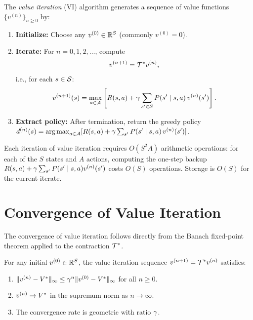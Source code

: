 \documentclass[11pt,a4paper]{article}
\begin{document}
\begin{definition}
\label{def:vi}
The \emph{value iteration} (VI) algorithm generates a sequence of
value functions $\{v^{(n)}\}_{n \geq 0}$ by:
\begin{enumerate}[nosep]
    \item \textbf{Initialize:} Choose any $v^{(0)} \in \mathbb{R}^S$
    (commonly $v^{(0)} = 0$).
    \item \textbf{Iterate:} For $n = 0, 1, 2, \ldots$, compute
    \[
        v^{(n+1)} = \mathcal{T}^* v^{(n)},
    \]
    i.e., for each $s \in \mathcal{S}$:
    \[
        v^{(n+1)}(s) = \max_{a \in \mathcal{A}}
        \left[ R(s,a) + \gamma \sum_{s' \in \mathcal{S}}
        P(s' \mid s,a)\, v^{(n)}(s') \right].
    \]
    \item \textbf{Extract policy:} After termination, return the
    greedy policy $d^{(n)}(s) = \operatorname{arg\,max}_{a \in \mathcal{A}}
    [R(s,a) + \gamma \sum_{s'} P(s' \mid s,a)\, v^{(n)}(s')]$.
\end{enumerate}
\end{definition}

\begin{remark}
\label{rem:vi-complexity}
Each iteration of value iteration requires $O(S^2 A)$ arithmetic
operations: for each of the $S$ states and $A$ actions, computing the
one-step backup $R(s,a) + \gamma \sum_{s'} P(s' \mid s,a)
v^{(n)}(s')$ costs $O(S)$ operations. Storage is $O(S)$ for the
current iterate.
\end{remark}


\section{Convergence of Value Iteration}
\label{sec:vi-convergence}

The convergence of value iteration follows directly from the Banach
fixed-point theorem applied to the contraction $\mathcal{T}^*$.

\begin{theorem}
\label{thm:vi-convergence}
For any initial $v^{(0)} \in \mathbb{R}^S$, the value iteration sequence
$v^{(n+1)} = \mathcal{T}^* v^{(n)}$ satisfies:
\begin{enumerate}[nosep]
    \item $\|v^{(n)} - V^*\|_\infty \leq
    \gamma^n \|v^{(0)} - V^*\|_\infty$ for all $n \geq 0$.
    \item $v^{(n)} \to V^*$ in the supremum norm as
    $n \to \infty$.
    \item The convergence rate is geometric with ratio $\gamma$.
\end{enumerate}
\end{theorem}
\end{document}
